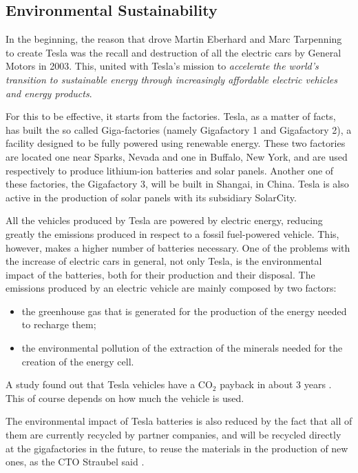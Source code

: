 \subsection{Environmental Sustainability}
In the beginning, the reason that drove Martin Eberhard and Marc Tarpenning to create Tesla was the recall and destruction of all the electric cars by General Motors\cite{muskGM} in 2003. This, united with Tesla's mission to \emph{accelerate the world’s transition to sustainable energy through increasingly affordable electric vehicles and energy products}\cite{aboutTesla}.

For this to be effective, it starts from the factories. Tesla, as a matter of facts, has built the so called Giga-factories (namely Gigafactory 1 and Gigafactory 2), a facility designed to be fully powered using renewable energy. These two factories are located one near Sparks, Nevada and one in Buffalo, New York, and are used respectively to produce lithium-ion batteries and solar panels.
Another one of these factories, the Gigafactory 3, will be built in Shangai, in China. 
Tesla is also active in the production of solar panels with its subsidiary SolarCity.

All the vehicles produced by Tesla are powered by electric energy, reducing greatly the emissions produced in respect to a fossil fuel-powered vehicle. This, however, makes a higher number of batteries necessary. 
One of the problems with the increase of electric cars in general, not only Tesla, is the environmental impact of the batteries, both for their production and their disposal. 
The emissions produced by an electric vehicle are mainly composed by two factors:
\begin{itemize}
    \item the greenhouse gas that is generated for the production of the energy needed to recharge them;
    \item the environmental pollution of the extraction of the minerals needed for the creation of the energy cell\cite{scheele2016cobalt}.
\end{itemize}
 A study found out that Tesla vehicles have a CO$_2$ payback in about 3 years \cite{electricStudy}. This of course depends on how much the vehicle is used. 

The environmental impact of Tesla batteries is also reduced by the fact that all of them are currently recycled by partner companies, and will be recycled directly at the gigafactories in the future, to reuse the materials in the production of new ones, as the CTO Straubel said \cite{recycleBattery}.

